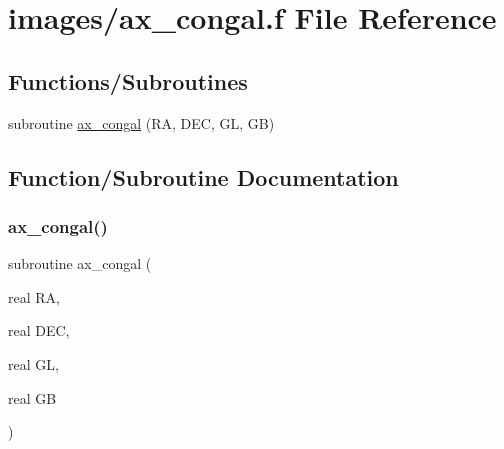 \hypertarget{ax__congal_8f}{}\section{images/ax\+\_\+congal.f File Reference}
\label{ax__congal_8f}
\subsection*{Functions/\+Subroutines}
\begin{DoxyCompactItemize}
\item 
subroutine \hyperlink{ax__congal_8f_a3ca84c62501c2e9b238e5f328854f7a5}{ax\+\_\+congal} (RA, D\+EC, GL, GB)
\end{DoxyCompactItemize}


\subsection{Function/\+Subroutine Documentation}
\mbox{\label{ax__congal_8f_a3ca84c62501c2e9b238e5f328854f7a5}} 
\subsubsection{\texorpdfstring{ax\+\_\+congal()}{ax\_congal()}}
{\footnotesize\ttfamily subroutine ax\+\_\+congal (\begin{DoxyParamCaption}\item[{real}]{RA,  }\item[{real}]{D\+EC,  }\item[{real}]{GL,  }\item[{real}]{GB }\end{DoxyParamCaption})}

